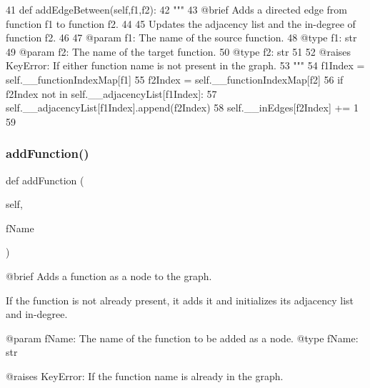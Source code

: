 \begin{DoxyCode}
41     \textcolor{keyword}{def }addEdgeBetween(self,f1,f2):
42         \textcolor{stringliteral}{"""
}
43 \textcolor{stringliteral}{        @brief Adds a directed edge from function f1 to function f2.
}
44 \textcolor{stringliteral}{
}
45 \textcolor{stringliteral}{        Updates the adjacency list and the in-degree of function f2.
}
46 \textcolor{stringliteral}{
}
47 \textcolor{stringliteral}{        @param f1: The name of the source function.
}
48 \textcolor{stringliteral}{        @type f1: str
}
49 \textcolor{stringliteral}{        @param f2: The name of the target function.
}
50 \textcolor{stringliteral}{        @type f2: str
}
51 \textcolor{stringliteral}{
}
52 \textcolor{stringliteral}{        @raises KeyError: If either function name is not present in the graph.
}
53 \textcolor{stringliteral}{        """}
54         f1Index = self.\_\_functionIndexMap[f1]
55         f2Index = self.\_\_functionIndexMap[f2]
56         \textcolor{keywordflow}{if} f2Index \textcolor{keywordflow}{not} \textcolor{keywordflow}{in} self.\_\_adjacencyList[f1Index]:
57             self.\_\_adjacencyList[f1Index].append(f2Index)
58             self.\_\_inEdges[f2Index] += 1
59     
\end{DoxyCode}
\mbox{\label{classDiGraph_1_1DiGraph_a9e00e5549f827c5cbba05adaa49d7e57}} 
\subsubsection{\texorpdfstring{add\+Function()}{addFunction()}}
{\footnotesize\ttfamily def add\+Function (\begin{DoxyParamCaption}\item[{}]{self,  }\item[{}]{f\+Name }\end{DoxyParamCaption})}

\begin{DoxyVerb}@brief Adds a function as a node to the graph.

If the function is not already present, it adds it and initializes its adjacency list and in-degree.

@param fName: The name of the function to be added as a node.
@type fName: str

@raises KeyError: If the function name is already in the graph.
\end{DoxyVerb}
 

